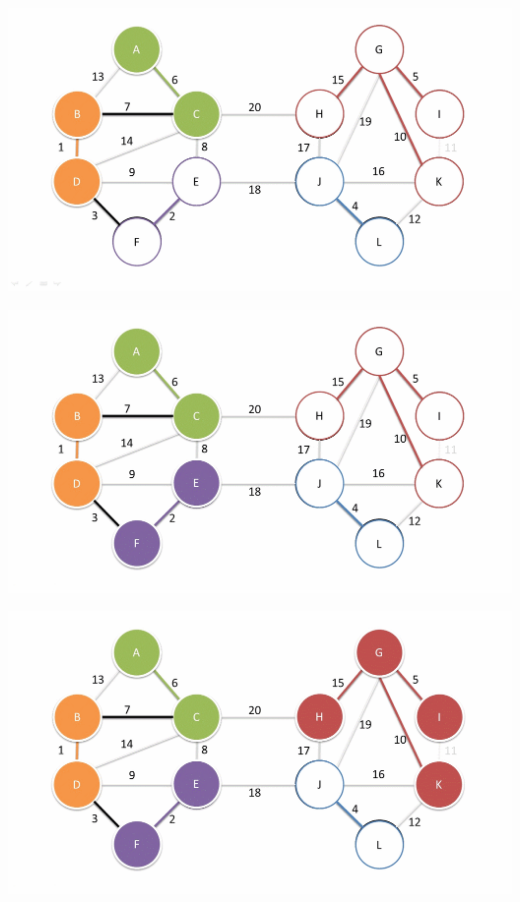 \documentclass[
	11pt, %
]{beamer}
\begin{document}
\begin{frame}
    \includegraphics[width = 1\textwidth]{baruvka-example/frame_24_delay-1s.png}
\end{frame}
\begin{frame}
    \includegraphics[width = 1\textwidth]{baruvka-example/frame_25_delay-2s.png}
\end{frame}
\begin{frame}
    \includegraphics[width = 1\textwidth]{baruvka-example/frame_26_delay-1s.png}
\end{frame}
\end{document}
